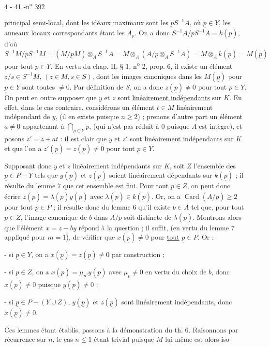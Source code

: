 \begin{center}4 - 41 -\hfill n\textsuperscript{o} 392\end{center}

principal semi-local, dont les idéaux maximaux sont les $\underline{p}S^{-1}A$, où $\underline{p}\in Y$, les anneaux locaux correspondants étant les $A_{\underline{p}}$. On a donc $S^{-1}A/\underline{p}S^{-1}A=k(\underline{p})$, d'où $S^{-1}M/\underline{p}S^{-1}M=(M/\underline{p}M)\otimes_A S^{-1}A=M\otimes_A(A/\underline{p}\otimes_A S^{-1}A)=M\otimes_A k(\underline{p})=M(\underline{p})$ pour tout $\underline{p}\in Y$. En vertu du chap. II, § 1, n\textsuperscript{o} 2, prop. 6, il existe un élément $z/s\in S^{-1}M$, $(z\in M,s\in S)$, dont les images canoniques dans les $M(\underline{p})$ pour $\underline{p}\in Y$ sont toutes $\ne0$. Par définition de $S$, on a donc $z(\underline{p})\ne0$ pour tout $\underline{p}\in Y$. On peut en outre supposer que $y$ et $z$ sont \uline{linéairement indépendants} sur $K$. En effet, dans le cas contraire, considérons un élément $t\in M$ linéairement indépendant de $y$, (il en existe puisque $n\ge2$) ; prenons d'autre part un élément $a\ne0$ appartenant à $\bigcap_{\underline{p}\in Y}\underline{p}$, (qui n'est pas réduit à $0$ puisque $A$ est intègre), et posons $z'=z+at$ : il est clair que $y$ et $z'$ sont linéairement indépendants sur $K$ et que l'on a $z'(\underline{p})=z(\underline{p})\ne0$ pour tout $\underline{p}\in Y$.

Supposant donc $y$ et $z$ linéairement indépendants sur $K$, soit $Z$ l'ensemble des $\underline{p}\in P-Y$ tels que $y(\underline{p})$ et $z(\underline{p})$ soient linéairement dépendants sur $k(\underline{p})$ ; il résulte du lemme 7 que cet ensemble est \uline{fini}. Pour tout $\underline{p}\in Z$, on peut donc écrire $z(\underline{p})=\lambda(\underline{p})y(\underline{p})$ avec $\lambda(\underline{p})\in k(\underline{p})$. Or, on a $\operatorname{Card}(A/\underline{p})\ge2$ pour tout $\underline{p}\in P$ ; il résulte donc du lemme 6 qu'il existe $b\in A$ tel que, pour tout $\underline{p}\in Z$, l'image canonique de $b$ dans $A/\underline{p}$ soit distincte de $\lambda(\underline{p})$. Montrons alors que l'élément $x=z-by$ répond à la question ; il suffit, (en vertu du lemme 7 appliqué pour $m=1$), de vérifier que $x(\underline{p})\ne0$ pour \uline{tout} $\underline{p}\in P$. Or :

- si $\underline{p}\in Y$, on a $x(\underline{p})=z(\underline{p})\ne0$ par construction ;

- si $\underline{p}\in Z$, on a $x(\underline{p})=\mu_{\underline{p}}.y(\underline{p})$ avec $\mu_{\underline{p}}\ne0$ en vertu du choix de $b$, donc $x(\underline{p})\ne0$ puisque $y(\underline{p})\ne0$ ;

- si $\underline{p}\in P-(Y\cup Z)$, $y(\underline{p})$ et $z(\underline{p})$ sont linéairement indépendants, donc $x(\underline{p})\ne0$.

Ces lemmes étant établis, passons à la démonstration du th. 6. Raisonnons par récurrence sur $n$, le cas $n\le1$ étant trivial puisque $M$ lui-même est alors iso-

